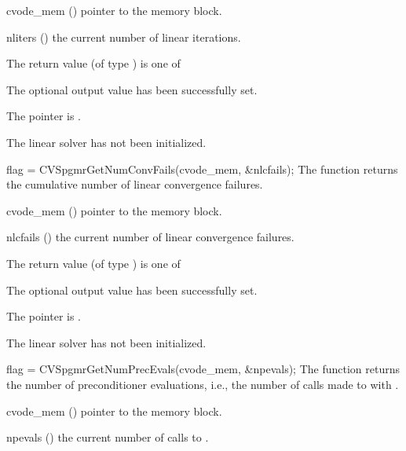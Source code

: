 {
  \begin{args}
  \item[cvode\_mem] ()
    pointer to the {\cvode} memory block.
  \item[nliters] ()
    the current number of linear iterations.
  \end{args}
}
{
  The return value  (of type ) is one of
  \begin{args}
  \item[\Id{CVSPGMR\_SUCCESS}] 
    The optional output value has been successfully set.
  \item[\Id{CVSPGMR\_MEM\_NULL}]
    The  pointer is .
  \item[\Id{CVSPGMR\_LMEM\_NULL}]
    The {\cvspgmr} linear solver has not been initialized.
  \end{args}
}
{}
{
  flag = CVSpgmrGetNumConvFails(cvode\_mem, \&nlcfails);
}
{
  The function  returns the
  cumulative number of linear convergence failures.
}
{
  \begin{args}
  \item[cvode\_mem] ()
    pointer to the {\cvode} memory block.
  \item[nlcfails] ()
    the current number of linear convergence failures.
  \end{args}
}
{
  The return value  (of type ) is one of
  \begin{args}
  \item[\Id{CVSPGMR\_SUCCESS}] 
    The optional output value has been successfully set.
  \item[\Id{CVSPGMR\_MEM\_NULL}]
    The  pointer is .
  \item[\Id{CVSPGMR\_LMEM\_NULL}]
    The {\cvspgmr} linear solver has not been initialized.
  \end{args}
}
{}
{
  flag = CVSpgmrGetNumPrecEvals(cvode\_mem, \&npevals);
}
{
  The function  returns the
  number of preconditioner evaluations, i.e., the number of 
  calls made to  with .
}
{
  \begin{args}
  \item[cvode\_mem] ()
    pointer to the {\cvode} memory block.
  \item[npevals] ()
    the current number of calls to .
  \end{args}
}
